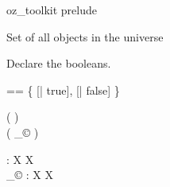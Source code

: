 \begin{zsection}
  \SECTION oz\_toolkit \parents prelude
\end{zsection}

Set of all objects in the universe

\begin{zed}
  [\oid]
\end{zed}

Declare the booleans.

\begin{zed}
  \bool == \{ [| true], [| false] \}
\end{zed}

\begin{zed}
  \function ( \poly \varg )\\
  \function ( \varg _{\copyright} )
\end{zed}

\begin{gendef}[X]
  \poly \varg : X \fun X\\
  \varg _{\copyright} : X \fun X
\end{gendef}
